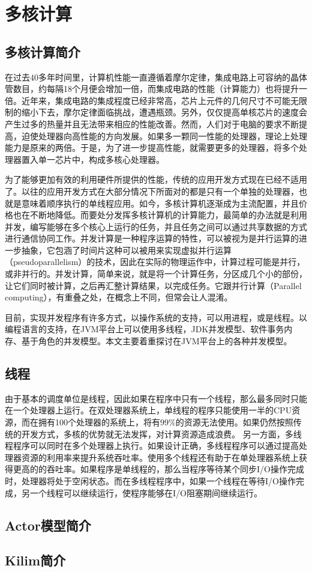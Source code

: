 
\chapter{多核计算}

\section{多核计算简介}
在过去40多年时间里，计算机性能一直遵循着摩尔定律，集成电路上可容纳的晶体管数目，约每隔18个月便会增加一倍，而集成电路的性能（计算能力）也将提升一倍。近年来，集成电路的集成程度已经非常高，芯片上元件的几何尺寸不可能无限制的缩小下去，摩尔定律面临挑战，遭遇瓶颈。另外，仅仅提高单核芯片的速度会产生过多的热量并且无法带来相应的性能改善。然而，人们对于电脑的要求不断提高，迫使处理器向高性能的方向发展。如果多一颗同一性能的处理器，理论上处理能力是原来的两倍。于是，为了进一步提高性能，就需要更多的处理器，将多个处理器置入单一芯片中，构成多核心处理器。

为了能够更加有效的利用硬件所提供的性能，传统的应用开发方式现在已经不适用了。以往的应用开发方式在大部分情况下所面对的都是只有一个单独的处理器，也就是意味着顺序执行的单线程应用。如今，多核计算机逐渐成为主流配置，并且价格也在不断地降低。而要处分发挥多核计算机的计算能力，最简单的办法就是利用并发，编写能够在多个核心上运行的任务，并且任务之间可以通过共享数据的方式进行通信协同工作。并发计算是一种程序运算的特性，可以被视为是并行运算的进一步抽象，它包涵了时间片这种可以被用来实现虚拟并行运算（pseudoparallelism）的技术，因此在实际的物理运作中，计算过程可能是并行，或非并行的。并发计算，简单来说，就是将一个计算任务，分区成几个小的部份，让它们同时被计算，之后再汇整计算结果，以完成任务。它跟并行计算（Parallel computing），有重叠之处，在概念上不同，但常会让人混淆。

目前，实现并发程序有许多方式，以操作系统的支持，可以用进程，或是线程。以编程语言的支持，在JVM平台上可以使用多线程，JDK并发模型、软件事务内存、基于角色的并发模型。本文主要着重探讨在JVM平台上的各种并发模型。


\section{线程}

由于基本的调度单位是线程，因此如果在程序中只有一个线程，那么最多同时只能在一个处理器上运行。在双处理器系统上，单线程的程序只能使用一半的CPU资源，而在拥有100个处理器的系统上，将有99$\%$的资源无法使用。如果仍然按照传统的开发方式，多核的优势就无法发挥，对计算资源造成浪费。
另一方面，多线程程序可以同时在多个处理器上执行。如果设计正确，多线程程序可以通过提高处理器资源的利用率来提升系统吞吐率。使用多个线程还有助于在单处理器系统上获得更高的的吞吐率。如果程序是单线程的，那么当程序等待某个同步I/O操作完成时，处理器将处于空闲状态。而在多线程程序中，如果一个线程在等待I/O操作完成，另一个线程可以继续运行，使程序能够在I/O阻塞期间继续运行。




\section{Actor模型简介}

\section{Kilim简介}




